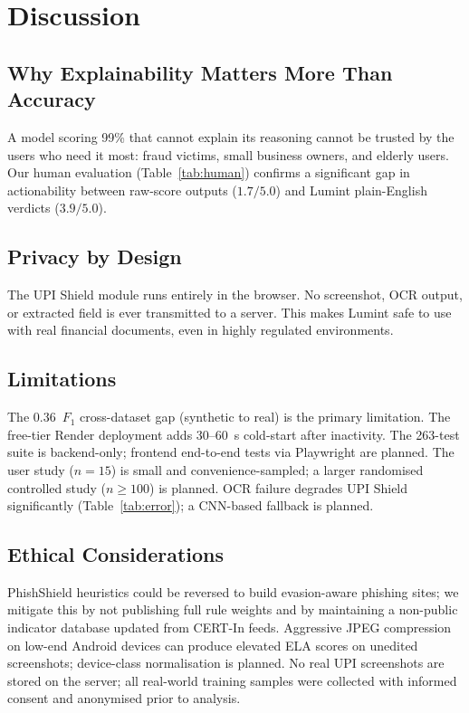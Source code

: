 \documentclass[conference]{IEEEtran}
\begin{document}
\section{Discussion}

\subsection{Why Explainability Matters More Than Accuracy}
\vspace{2mm}
A model scoring 99\% that cannot explain its reasoning cannot be trusted
by the users who need it most: fraud victims, small business owners, and
elderly users. Our human evaluation (Table~\ref{tab:human}) confirms a
significant gap in actionability between raw-score outputs
($1.7/5.0$) and Lumint plain-English verdicts ($3.9/5.0$).

\subsection{Privacy by Design}
\vspace{2mm}
The UPI Shield module runs entirely in the browser. No screenshot, OCR
output, or extracted field is ever transmitted to a server. This makes
Lumint safe to use with real financial documents, even in highly
regulated environments.

\subsection{Limitations}
\vspace{2mm}
The 0.36~$F_1$ cross-dataset gap (synthetic to real) is the primary
limitation. The free-tier Render deployment adds 30--60~s cold-start
after inactivity. The 263-test suite is backend-only; frontend
end-to-end tests via Playwright are planned. The user study ($n{=}15$)
is small and convenience-sampled; a larger randomised controlled study
($n{\geq}100$) is planned. OCR failure degrades UPI Shield
significantly (Table~\ref{tab:error}); a CNN-based fallback is planned.

\subsection{Ethical Considerations}
\vspace{2mm}
PhishShield heuristics could be reversed to build evasion-aware
phishing sites; we mitigate this by not publishing full rule weights
and by maintaining a non-public indicator database updated from
CERT-In feeds. Aggressive JPEG compression on low-end Android devices
can produce elevated ELA scores on unedited screenshots;
device-class normalisation is planned. No real UPI screenshots are
stored on the server; all real-world training samples were collected
with informed consent and anonymised prior to analysis.
\end{document}
